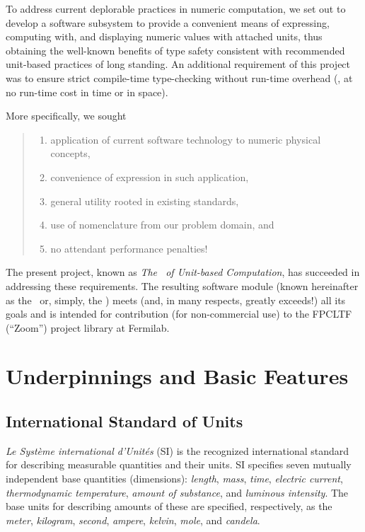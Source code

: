 To address current deplorable practices in numeric computation,
we set out to develop a software subsystem
to provide a convenient means
of expressing, computing with, and displaying
numeric values with attached units,
thus obtaining the well-known benefits of type safety
consistent with recommended unit-based practices of long standing.
An additional requirement of this project
was to ensure strict compile-time type-checking
without run-time overhead
(\ie, at no run-time cost in time or in space).

More specifically, we sought
\begin{quote}
\begin{enumerate}
  \item
    application of current software technology
    to numeric physical concepts,
  \item
    convenience of expression in such application,
  \item
    general utility rooted in existing standards,
  \item
    use of nomenclature from our problem domain, and
  \item
    no attendant performance penalties!
\end{enumerate}
\end{quote}
The present project, known as
{\it The \SIlib\ of Unit-based Computation},
has succeeded in addressing these requirements.
The resulting software module
(known hereinafter as the \SIlib\ 
or, simply, the \lib)
meets (and, in many respects, greatly exceeds!) all its goals
and is intended for contribution
(for non-commercial use)
to the FPCLTF (``Zoom'') project library at Fermilab.




\section{ Underpinnings and Basic Features }

\subsection{ International Standard of Units }

{\it Le Syst\`{e}me international d'Unit\'{e}s} (SI) \cite{BIPM}
is the recognized international standard
for describing measurable quantities and their units.
SI specifies seven mutually independent base quantities (dimensions):
{\it length},
{\it mass},
{\it time},
{\it electric current},
{\it thermodynamic temperature},
{\it amount of substance}, and
{\it luminous intensity}.
The base units for describing amounts of these
are specified, respectively, as the
{\it meter},
{\it kilogram},
{\it second},
{\it ampere},
{\it kelvin},
{\it mole}, and
{\it candela}.

